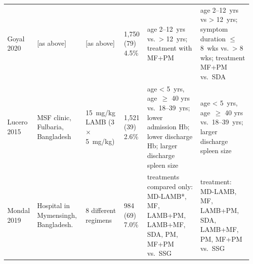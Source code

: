 {\begin{landscape}
\begin{ThreePartTable}
\begin{longtable}[c]{@{} L{3.1cm} L{2.5cm} L{2cm} L{1.7cm} L{6cm} L{6cm} @{}}
      \hspace{0.5em}Goyal 2020\cite{goyal2020}     & [as above]                                                        & [as above]                         & 1,750 (79) 4.5\%     & age 2--12~yrs\mtnote{$\dagger\dagger$} vs.\ > 12~yrs; treatment with MF+PM\mtnote{$\dagger\dagger$}                                                                                                                                                                                                                               & age 2--12~yrs\mtnote{***} vs > 12~yrs; symptom duration $\leq$ 8~wks\mtnote{***} vs.\ > 8 wks; treatment MF+PM\mtnote{****} vs.\ SDA                                                                                                        \\
      \hspace{0.5em}Lucero 2015\cite{lucero2015}   & MSF clinic, Fulbaria, Bangladesh                                  & 15~mg/kg LAMB (3 $\times$ 5~mg/kg) & 1,521 (39) 2.6\%     & age < 5~yrs\mtnote{***}, age~$\geq$ 40 yrs\mtnote{**} vs.\ 18--39~yrs; lower admission Hb\mtnote{***}; lower discharge Hb\mtnote{***}; larger discharge spleen size\mtnote{***}                                                                                                                                                   & age < 5~yrs\mtnote{***}, age~$\geq$ 40 yrs\mtnote{**} vs.\ 18--39~yrs; larger discharge spleen size\mtnote{**}                                                                                                                              \\
      \hspace{0.5em}Mondal 2019\cite{mondal2019}   & Hospital in Mymensingh, Bangladesh.                               & 8 different regimens               & 984 (69) 7.0\%       & treatments compared only: MD-LAMB*, MF\mtnote{**}, LAMB+PM\mtnote{**}, LAMB+MF\mtnote{***}, SDA\mtnote{****}, PM\mtnote{****}, MF+PM\mtnote{****} vs.\ SSG                                                                                                                                                                        & treatment: MD-LAMB\mtnote{*}, MF\mtnote{**}, LAMB+PM\mtnote{**}, SDA\mtnote{***}, LAMB+MF\mtnote{****}, PM\mtnote{****}, MF+PM\mtnote{****} vs.\ SSG                                                                                        \\

\end{longtable}
\end{ThreePartTable}
\end{landscape}}
